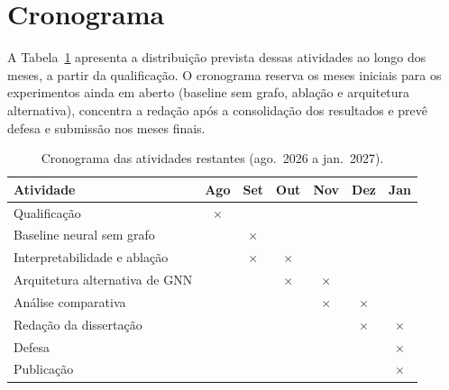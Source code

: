
\section{Cronograma}

A Tabela~\ref{tab:cronograma} apresenta a distribuição prevista dessas atividades ao longo dos meses, a partir da qualificação. O cronograma reserva os meses iniciais para os experimentos ainda em aberto (baseline sem grafo, ablação e arquitetura alternativa), concentra a redação após a consolidação dos resultados e prevê defesa e submissão nos meses finais.

\begin{table}[htbp]
\centering
\caption{Cronograma das atividades restantes (ago.\ 2026 a jan.\ 2027).}
\label{tab:cronograma}
\footnotesize
\begin{tabular}{lcccccc}
\hline
\textbf{Atividade} & \textbf{Ago} & \textbf{Set} & \textbf{Out} & \textbf{Nov} & \textbf{Dez} & \textbf{Jan} \\
\hline
Qualificação                    & $\times$ &          &          &          &          &          \\
Baseline neural sem grafo       &          & $\times$ &          &          &          &          \\
Interpretabilidade e ablação    &          & $\times$ & $\times$ &          &          &          \\
Arquitetura alternativa de GNN  &          &          & $\times$ & $\times$ &          &          \\
Análise comparativa             &          &          &          & $\times$ & $\times$ &          \\
Redação da dissertação          &          &          &          &          & $\times$ & $\times$ \\
Defesa                          &          &          &          &          &          & $\times$ \\
Publicação                      &          &          &          &          &          & $\times$ \\
\hline
\end{tabular}
\end{table}
